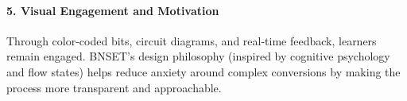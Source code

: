 \documentclass{article}
\begin{document}
\paragraph{5. Visual Engagement and Motivation}
Through color-coded bits, circuit diagrams, and real-time feedback, learners remain engaged. BNSET’s design philosophy (inspired by cognitive psychology and flow states) helps reduce anxiety around complex conversions by making the process more transparent and approachable.
\end{document}
